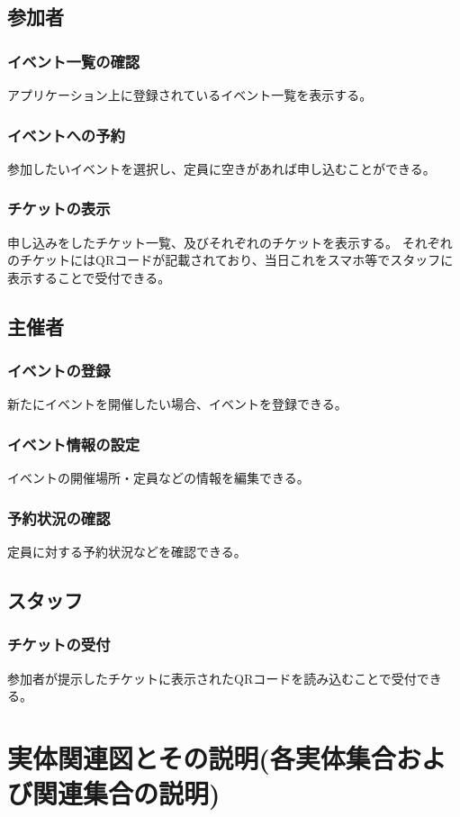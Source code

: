 \documentclass[dvipdfmx]{jarticle}
\begin{document}
\subsection{参加者}
\subsubsection{イベント一覧の確認}
アプリケーション上に登録されているイベント一覧を表示する。
\subsubsection{イベントへの予約}
参加したいイベントを選択し、定員に空きがあれば申し込むことができる。
\subsubsection{チケットの表示}
申し込みをしたチケット一覧、及びそれぞれのチケットを表示する。
それぞれのチケットにはQRコードが記載されており、当日これをスマホ等でスタッフに表示することで受付できる。
\subsection{主催者}
\subsubsection{イベントの登録}
新たにイベントを開催したい場合、イベントを登録できる。
\subsubsection{イベント情報の設定}
イベントの開催場所・定員などの情報を編集できる。
\subsubsection{予約状況の確認}
定員に対する予約状況などを確認できる。
\subsection{スタッフ}
\subsubsection{チケットの受付}
参加者が提示したチケットに表示されたQRコードを読み込むことで受付できる。

\section{実体関連図とその説明(各実体集合および関連集合の説明)}
\end{document}
